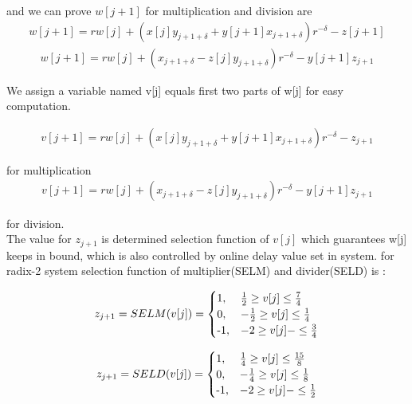 \documentclass[10pt]{article}
\begin{document}
and we can prove $w[j+1]$ for multiplication and division are
\begin{gather}
    w[j+1] = rw[j]+(x[j]y_{j+1+\delta}+y[j+1]x_{j+1+\delta})r^{-\delta}-z[j+1]
\end{gather}
\begin{gather}
        w[j+1] = rw[j]+(x_{j+1+\delta}-z[j]y_{j+1+\delta})r^{-\delta}-y[j+1]z_{j+1}   
\end{gather}

We assign a variable named v[j] equals first two parts of w[j] for easy computation.

\begin{gather}
    v[j+1] = rw[j]+(x[j]y_{j+1+\delta}+y[j+1]x_{j+1+\delta})r^{-\delta}-z_{j+1}
\end{gather}

for multiplication
\begin{gather}
        v[j+1] = rw[j]+(x_{j+1+\delta}-z[j]y_{j+1+\delta})r^{-\delta}-y[j+1]z_{j+1}   
\end{gather}

for division.\\

The value for $z_{j+1}$ is determined selection function of $v[j]$ which guarantees w[j] keeps in bound, which is also controlled by online delay value set in system. for radix-2 system selection function of multiplier(SELM) and divider(SELD) is  :

\begin{gather}
        z_{j+1} = SELM(v[j]) = 
    \begin{cases}
        $1$,&   \frac{1}{2} \geq v[j] \leq \frac{7}{4}\\
        $0$,&   -\frac{1}{2} \geq v[j] \leq \frac{1}{4}\\
        $-1$,&  -2 \geq v[j] -\leq \frac{3}{4}\\
    \end{cases}
\end{gather} 

\begin{gather}
        z_{j+1} = SELD(v[j]) = 
    \begin{cases}
        $1$,&   \frac{1}{4} \geq v[j] \leq \frac{15}{8}\\
        $0$,&   -\frac{1}{4} \geq v[j] \leq \frac{1}{8}\\
        $-1$,&  -2 \geq v[j] -\leq \frac{1}{2}\\
    \end{cases}
\end{gather} 
\end{document}
